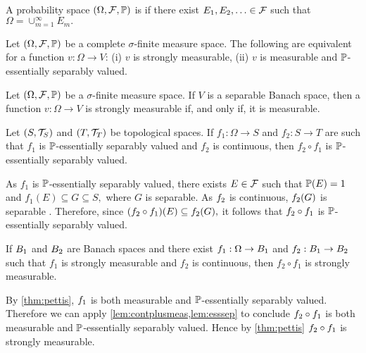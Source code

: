 A probability space $\OFP$ is  if there exist $E_1,E_2,\ldots \in \mathcal F$ such that $\Omega = \cup_{m=1}^\infty E_m.$
\ede

\label{thm:pettis}
Let $\OFP$ be a complete $\sigma$-finite measure space. The following are equivalent for a function $v:\Omega \rightarrow V$:
(i) $v$ is  strongly measurable,
(ii) $v$ is measurable and $\mathbb P$-essentially separably valued.
\enth

\label{cor:pettis}
Let $\OFP$ be a $\sigma$-finite measure space. If $V$ is a separable Banach space, then a function $v:\Omega\rightarrow V$ is strongly measurable if, and only if, it is measurable.
\eco

\label{lem:esssep}
Let $\mleft(S,\TS\mright)$ and $\mleft(T,\TopT\mright)$ be topological spaces. If $f_1:\Omega \rightarrow S$ and $f_2:S\rightarrow T$ are such that $f_1$ is $\mathbb P$-essentially separably valued and $f_2$ is continuous, then $f_2\circ f_1$ is $\mathbb P$-essentially separably valued.
\ele

As $f_1$ is $\mathbb P$-essentially separably valued, there exists $E \in \mathcal F$ such that $\mathbb P(E) = 1$ and $f_1(E) \subseteq G \subseteq S,$ where $G$ is separable. As $f_{2}$ is continuous, $f_{2}(G)$ is separable \cite[Theorem 16.4(a)]{Wi:70}. Therefore, since $\mleft(\ft \circ\fo\mright)(E) \subseteq \ft(G),$ it follows that $f_{2}\circ f_{1}$ is $\mathbb P$-essentially separably valued.
\epf



\label{lem:contplusstrong}
If $B_{1}$ and $B_{2}$ are Banach spaces and there exist $f_1:\Omega \rightarrow B_{1}$ and $f_2:B_{1}\rightarrow B_{2}$ such that $f_1$ is strongly measurable and $f_2$ is continuous, then $f_2\circ f_1$ is strongly measurable.
\ele

By \cref{thm:pettis}, $f_{1}$ is both measurable and $\mathbb P$-essentially separably valued. Therefore we can apply \cref{lem:contplusmeas,lem:esssep} to conclude $f_{2} \circ f_{1}$ is both measurable and $\mathbb P$-essentially separably valued. Hence by \cref{thm:pettis} $f_{2}\circ f_{1}$ is strongly measurable.
\epf

